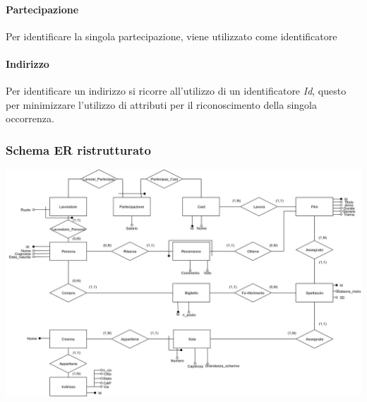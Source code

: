 \documentclass[10pt]{article}
\begin{document}
	\paragraph{Partecipazione}
	Per identificare la singola partecipazione, viene utilizzato come identificatore \textit{}
	\paragraph{Indirizzo}
	Per identificare un indirizzo si ricorre all'utilizzo di un identificatore \textit{Id}, questo per minimizzare l'utilizzo di attributi per il riconoscimento della singola occorrenza.
	\subsubsection{Schema ER ristrutturato}	
	\includegraphics[height=\textwidth, width=23cm, angle=90]{SchemaER_Rev}
\end{document}
